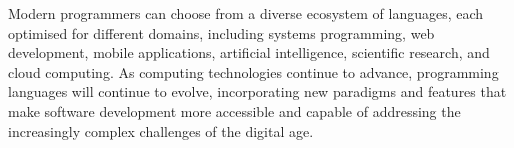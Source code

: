 Modern programmers can choose from a diverse ecosystem of languages, each optimised for different domains, including systems programming, web development, mobile applications, artificial intelligence, scientific research, and cloud computing. As computing technologies continue to advance, programming languages will continue to evolve, incorporating new paradigms and features that make software development more accessible and capable of addressing the increasingly complex challenges of the digital age.
